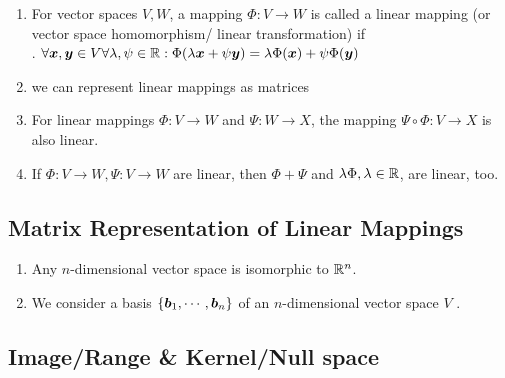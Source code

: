 \begin{enumerate}
    \item
    \begin{definition}
        For vector spaces $V, W$, a mapping $\Phi : V \to W$ is called a linear mapping (or vector space homomorphism/ linear transformation) if
        \hfill \cite{mfml/book/mml/Deisenroth-Faisal-Ong}
        \\
        .\hfill
        $
            \forall \bm{x}, \bm{y} \in V \forall \lambda , \psi  \in \mathbb{R} :
            \Phi(\lambda \bm{x} + \psi \bm{y}) = \lambda \Phi(\bm{x}) + \psi \Phi(\bm{y})
        $
        \hfill \cite{mfml/book/mml/Deisenroth-Faisal-Ong}
    \end{definition}

    \item we can represent linear mappings as matrices
    \hfill \cite{mfml/book/mml/Deisenroth-Faisal-Ong}

    \item For linear mappings $\Phi : V \to W$ and $\Psi : W \to X$, the mapping $\Psi \circ \Phi : V \to X$ is also linear.
    \hfill \cite{mfml/book/mml/Deisenroth-Faisal-Ong}

    \item If $\Phi : V \to W, \Psi : V \to W$ are linear, then $\Phi + \Psi$ and $\lambda\Phi, \lambda \in \mathbb{R}$, are linear, too.
    \hfill \cite{mfml/book/mml/Deisenroth-Faisal-Ong}
\end{enumerate}



\subsection{Matrix Representation of Linear Mappings}

\begin{enumerate}
    \item Any $n$-dimensional vector space is isomorphic to $\mathbb{R}^n$.
    \hfill \cite{mfml/book/mml/Deisenroth-Faisal-Ong}

    \item We consider a basis $\left\{\bm{b}_1, \cdots , \bm{b}_n\right\}$ of an $n$-dimensional vector space $V$ .
    \hfill \cite{mfml/book/mml/Deisenroth-Faisal-Ong}
\end{enumerate}




\subsection{Image/Range \& Kernel/Null space}

